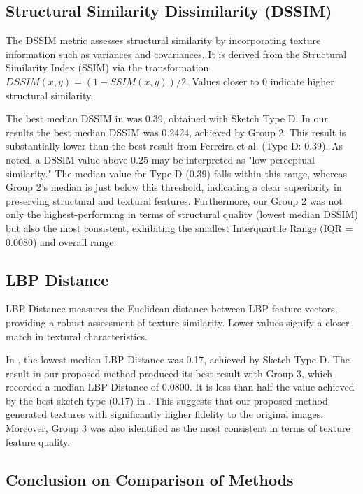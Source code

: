 \documentclass{ieeeaccess}
\begin{document}
\subsection{Structural Similarity Dissimilarity (DSSIM)}

The DSSIM metric assesses structural similarity by incorporating texture information such as variances and covariances. It is derived from the Structural Similarity Index (SSIM) via the transformation $DSSIM(x, y) = (1 - SSIM(x, y))/2$. Values closer to 0 indicate higher structural similarity.

The best median DSSIM in \cite{ref19} was 0.39, obtained with Sketch Type D. In our results the best median DSSIM was 0.2424, achieved by Group 2. This result is substantially lower than the best result from Ferreira et al. (Type D: 0.39). As noted, a DSSIM value above 0.25 may be interpreted as "low perceptual similarity." The median value for Type D (0.39) falls within this range, whereas Group 2's median is just below this threshold, indicating a clear superiority in preserving structural and textural features. Furthermore, our Group 2 was not only the highest-performing in terms of structural quality (lowest median DSSIM) but also the most consistent, exhibiting the smallest Interquartile Range (IQR = 0.0080) and overall range.

\subsection{LBP Distance}

LBP Distance measures the Euclidean distance between LBP feature vectors, providing a robust assessment of texture similarity. Lower values signify a closer match in textural  characteristics.

In \cite{ref19}, the lowest median LBP Distance was 0.17, achieved by Sketch Type D. The result in our proposed method produced its best result with Group 3, which recorded a median LBP Distance of 0.0800. It is less than half the value achieved by the best sketch type (0.17) in \cite{ref19}. This suggests that our proposed method generated textures with significantly higher fidelity to the original images. Moreover, Group 3 was also identified as the most consistent in terms of texture feature quality.

\subsection{Conclusion on Comparison of Methods}
\end{document}
